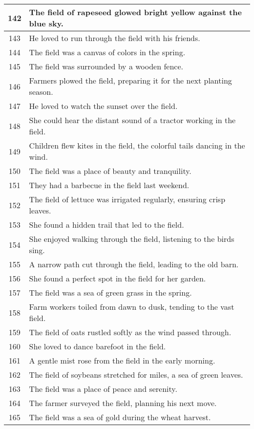 \begin{longtable}{|c|p{12cm}|}
142 & The field of rapeseed glowed bright yellow against the blue sky. \\ \hline
143 & He loved to run through the field with his friends. \\ \hline
144 & The field was a canvas of colors in the spring. \\ \hline
145 & The field was surrounded by a wooden fence. \\ \hline
146 & Farmers plowed the field, preparing it for the next planting season. \\ \hline
147 & He loved to watch the sunset over the field. \\ \hline
148 & She could hear the distant sound of a tractor working in the field. \\ \hline
149 & Children flew kites in the field, the colorful tails dancing in the wind. \\ \hline
150 & The field was a place of beauty and tranquility. \\ \hline
151 & They had a barbecue in the field last weekend. \\ \hline
152 & The field of lettuce was irrigated regularly, ensuring crisp leaves. \\ \hline
153 & She found a hidden trail that led to the field. \\ \hline
154 & She enjoyed walking through the field, listening to the birds sing. \\ \hline
155 & A narrow path cut through the field, leading to the old barn. \\ \hline
156 & She found a perfect spot in the field for her garden. \\ \hline
157 & The field was a sea of green grass in the spring. \\ \hline
158 & Farm workers toiled from dawn to dusk, tending to the vast field. \\ \hline
159 & The field of oats rustled softly as the wind passed through. \\ \hline
160 & She loved to dance barefoot in the field. \\ \hline
161 & A gentle mist rose from the field in the early morning. \\ \hline
162 & The field of soybeans stretched for miles, a sea of green leaves. \\ \hline
163 & The field was a place of peace and serenity. \\ \hline
164 & The farmer surveyed the field, planning his next move. \\ \hline
165 & The field was a sea of gold during the wheat harvest. \\ \hline

\end{longtable}
